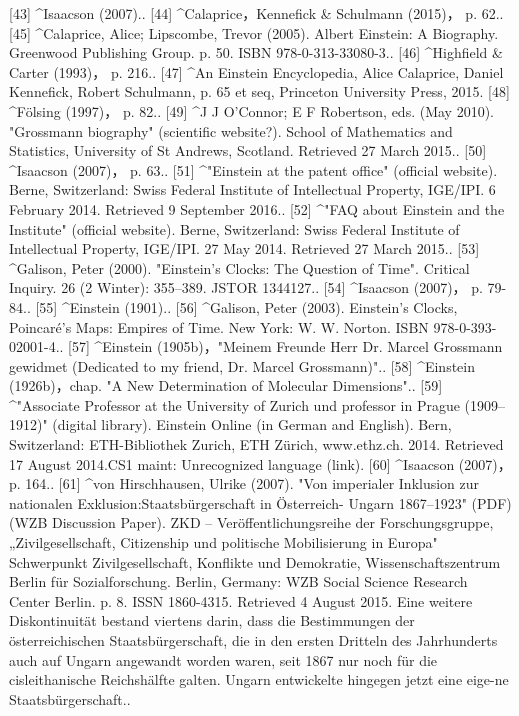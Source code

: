 [43]
^Isaacson (2007)..
[44]
^Calaprice，Kennefick & Schulmann (2015)， p. 62..
[45]
^Calaprice, Alice; Lipscombe, Trevor (2005). Albert Einstein: A Biography. Greenwood Publishing Group. p. 50. ISBN 978-0-313-33080-3..
[46]
^Highfield & Carter (1993)， p. 216..
[47]
^An Einstein Encyclopedia, Alice Calaprice, Daniel Kennefick, Robert Schulmann, p. 65 et seq, Princeton University Press, 2015.
[48]
^Fölsing (1997)， p. 82..
[49]
^J J O'Connor; E F Robertson, eds. (May 2010). "Grossmann biography" (scientific website?). School of Mathematics and Statistics, University of St Andrews, Scotland. Retrieved 27 March 2015..
[50]
^Isaacson (2007)， p. 63..
[51]
^"Einstein at the patent office" (official website). Berne, Switzerland: Swiss Federal Institute of Intellectual Property, IGE/IPI. 6 February 2014. Retrieved 9 September 2016..
[52]
^"FAQ about Einstein and the Institute" (official website). Berne, Switzerland: Swiss Federal Institute of Intellectual Property, IGE/IPI. 27 May 2014. Retrieved 27 March 2015..
[53]
^Galison, Peter (2000). "Einstein's Clocks: The Question of Time". Critical Inquiry. 26 (2 Winter): 355–389. JSTOR 1344127..
[54]
^Isaacson (2007)， p. 79-84..
[55]
^Einstein (1901)..
[56]
^Galison, Peter (2003). Einstein's Clocks, Poincaré's Maps: Empires of Time. New York: W. W. Norton. ISBN 978-0-393-02001-4..
[57]
^Einstein (1905b)，"Meinem Freunde Herr Dr. Marcel Grossmann gewidmet (Dedicated to my friend, Dr. Marcel Grossmann)"..
[58]
^Einstein (1926b)，chap. "A New Determination of Molecular Dimensions"..
[59]
^"Associate Professor at the University of Zurich und professor in Prague (1909–1912)" (digital library). Einstein Online (in German and English). Bern, Switzerland: ETH-Bibliothek Zurich, ETH Zürich, www.ethz.ch. 2014. Retrieved 17 August 2014.CS1 maint: Unrecognized language (link).
[60]
^Isaacson (2007)， p. 164..
[61]
^von Hirschhausen, Ulrike (2007). "Von imperialer Inklusion zur nationalen Exklusion:Staatsbürgerschaft in Österreich- Ungarn 1867–1923" (PDF) (WZB Discussion Paper). ZKD – Veröffentlichungsreihe der Forschungsgruppe, „Zivilgesellschaft, Citizenship und politische Mobilisierung in Europa" Schwerpunkt Zivilgesellschaft, Konflikte und Demokratie, Wissenschaftszentrum Berlin für Sozialforschung. Berlin, Germany: WZB Social Science Research Center Berlin. p. 8. ISSN 1860-4315. Retrieved 4 August 2015. Eine weitere Diskontinuität bestand viertens darin, dass die Bestimmungen der österreichischen Staatsbürgerschaft, die in den ersten Dritteln des Jahrhunderts auch auf Ungarn angewandt worden waren, seit 1867 nur noch für die cisleithanische Reichshälfte galten. Ungarn entwickelte hingegen jetzt eine eige-ne Staatsbürgerschaft..

